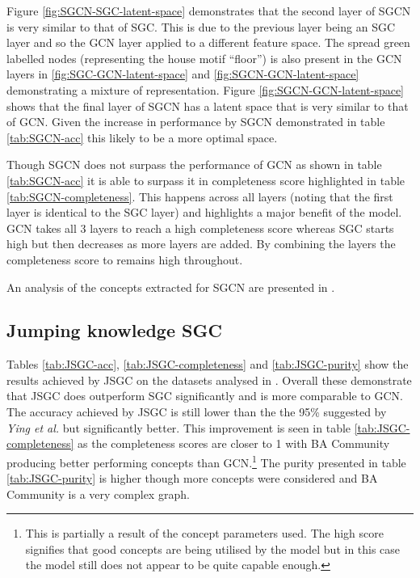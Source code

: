 Figure \ref{fig:SGCN-SGC-latent-space} demonstrates that the second layer of SGCN is very similar to that of SGC.
This is due to the previous layer being an SGC layer and so the GCN layer applied to a different feature space.
The spread green labelled nodes (representing the house motif ``floor'') is also present in the GCN layers in \ref{fig:SGC-GCN-latent-space} and \ref{fig:SGCN-GCN-latent-space} demonstrating a mixture of representation.
Figure \ref{fig:SGCN-GCN-latent-space} shows that the final layer of SGCN has a latent space that is very similar to that of GCN.
Given the increase in performance by SGCN demonstrated in table \ref{tab:SGCN-acc} this likely to be a more optimal space.

Though SGCN does not surpass the performance of GCN as shown in table \ref{tab:SGCN-acc} it is able to surpass it in completeness score highlighted in table \ref{tab:SGCN-completeness}.
This happens across all layers (noting that the first layer is identical to the SGC layer) and highlights a major benefit of the model.
GCN takes all 3 layers to reach a high completeness score whereas SGC starts high but then decreases as more layers are added.
By combining the layers the completeness score to remains high throughout.

An analysis of the concepts extracted for SGCN are presented in .

\subsection{Jumping knowledge SGC}
\label{sec:Jump-SGC}





Tables \ref{tab:JSGC-acc}, \ref{tab:JSGC-completeness} and \ref{tab:JSGC-purity} show the results achieved by JSGC on the datasets analysed in .
Overall these demonstrate that JSGC does outperform SGC significantly and is more comparable to GCN.
The accuracy achieved by JSGC is still lower than the the 95\% suggested by \textit{Ying et al.}\cite{ying2019gnnexplainer} but significantly better.
This improvement is seen in table \ref{tab:JSGC-completeness} as the completeness scores are closer to 1 with BA Community producing better performing concepts than GCN.\footnote{This is partially a result of the concept parameters used. The high score signifies that good concepts are being utilised by the model but in this case the model still does not appear to be quite capable enough.}
The purity presented in table \ref{tab:JSGC-purity} is higher though more concepts were considered and BA Community is a very complex graph.

